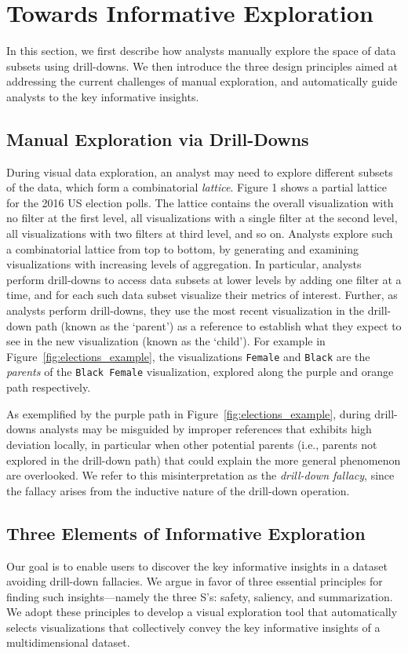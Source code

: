 \section{Towards Informative Exploration}
In this section, we first describe how analysts manually explore the space of data subsets using drill-downs. We then introduce the three design principles aimed at addressing the current challenges of manual exploration, and automatically guide analysts to the key informative insights. 
\subsection{Manual Exploration via Drill-Downs}
During visual data exploration, an analyst may need to explore different subsets of the data, which form a combinatorial \emph{lattice}. Figure 1 shows a partial lattice for the 2016 US election polls. The lattice contains the overall visualization with no filter at the first level, all visualizations with a single filter at the second level, all visualizations with two filters at third level, and so on. Analysts explore such a combinatorial lattice from top to bottom, by generating and examining visualizations with increasing levels of aggregation. In particular, analysts perform drill-downs to access data subsets at lower levels by adding one filter at a time, and for each such data subset visualize their metrics of interest. Further, as analysts perform drill-downs, they use the most recent visualization in the drill-down path (known as the `parent') as a reference to establish what they expect to see in the new visualization (known as the `child'). For example in Figure~\ref{fig:elections_example}, the visualizations \texttt{Female} and \texttt{Black} are the \emph{parents} of the \texttt{Black Female} visualization, explored along the purple and orange path respectively.
\par As exemplified by the purple path in Figure~\ref{fig:elections_example}, during drill-downs analysts may be misguided by improper references that exhibits high deviation locally, in particular when other potential parents (i.e., parents not explored in the drill-down path) that could explain the more general phenomenon are overlooked. We refer to this misinterpretation as the \emph{drill-down fallacy}, since the fallacy arises from the inductive nature of the drill-down operation. 
\subsection{Three Elements of Informative Exploration}
Our goal is to enable users to discover the key informative insights in a dataset avoiding drill-down fallacies. We argue in favor of three essential principles for finding such insights---namely the three S's: safety, saliency, and summarization. We adopt these principles to develop a visual exploration tool that automatically selects visualizations that collectively convey the key informative insights of a multidimensional dataset.
